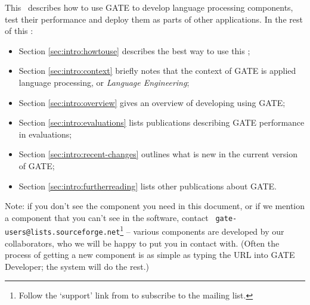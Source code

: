 This \thing\ describes how to use GATE to develop language processing
components, test their performance and deploy them as parts of other
applications. In the rest of this \chapthing:

\begin{itemize}
\item
Section \ref{sec:intro:howtouse} describes the best way to use this \thing;
\item
Section \ref{sec:intro:context} briefly notes that the context of GATE is
applied language processing, or {\em Language Engineering};
\item
Section \ref{sec:intro:overview} gives an overview of developing using GATE;
\item
Section \ref{sec:intro:evaluations} lists publications describing GATE
performance in evaluations;
\item
Section \ref{sec:intro:recent-changes} outlines what is new in the current
version of GATE;
\item
Section \ref{sec:intro:furtherreading} lists other publications about GATE.
\end{itemize}

Note: if you don't see the component you need in this document, or if we
mention a component that you can't see in the software, contact {\tt
gate-users@lists.sourceforge.net}\footnote{Follow the `support' link from
 to subscribe to the mailing
list.} -- various components are developed by our collaborators, who
we will be happy to put you in contact with.  (Often the process of
getting a new component is as simple as typing the URL into GATE
Developer; the system will do the rest.)


